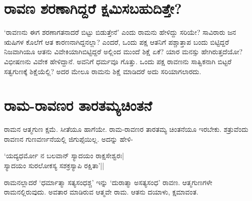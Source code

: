 \section*{ರಾವಣ ಶರಣಾಗಿದ್ದರೆ ಕ್ಷಮಿಸಬಹುದಿತ್ತೇ?}

`ರಾವಣನು ಈಗ ಶರಣಾಗತನಾದರೆ ಬಿಟ್ಟು ಬಿಡುತ್ತೇನೆ' ಎಂದು ರಾಮನು ಹೇಳಿದ್ದು  ಸರಿಯೇ? ಸಾವಿರಾರು ಜನ ಋಷಿಗಳ ಕೊಲೆಗೆ ಆತ ಕಾರಣನಾಗಿದ್ದನಲ್ಲಾ? ಎಂದರೆ, ಒಂದು ಪಕ್ಷ ಆತನಿಗೆ ಪಶ್ಚಾತ್ತಾಪ ಬಂದು ಬಿಟ್ಟಿದ್ದರೆ ನಿಜವಾಗಿಯೂ ಆತನು ವಿವೇಕಿಯಾಗಿಬಿಟ್ಟಿದ್ದರೆ ಅಲ್ಲಿಂದ ಮುಂದೆ ಶಿಕ್ಷೆ ಏಕೆ? ಯಾರ ಮನಸ್ಸು ಹೇಗಿರುತ್ತದೆಯೋ? ವಿಭೀಷಣನು ವಿವೇಕ ಹೇಳಿದ್ದಾನೆ. ಅವನಿಗೆ ಧರ್ಮವೂ ಗೊತ್ತು. ಒಂದು ಪಕ್ಷ ರಾವಣನು ಸಾತ್ವಿಕನಾಗಿ ಬಿಟ್ಟರೆ ಸತ್ವಗುಣಕ್ಕೆ ಶಿಕ್ಷೆಯೆಲ್ಲಿ? ಅದರ ಮೇಲೂ ರಾಮನು ಶಿಕ್ಷೆ ಮಾಡಿದರೆ ಅದು ಸರಿಯಾಗಲಾರದು.

\section*{ರಾಮ-ರಾವಣರ ತಾರತಮ್ಯಚಿಂತನೆ}

ರಾಮನ ಆತ್ಮಗುಣ ಕ್ಷಮೆ. ಸೀತೆಯೂ ಹಾಗೆಯೇ. ರಾಮ-ರಾವಣರ ತಾರತಮ್ಯ ಚಿಂತನೆಯೂ ಇರಬೇಕು. ಶತ್ರುವೆಂದು ರಾವಣನ ಗುಣವರ್ಣನೆಯಲ್ಲಿ ಜಿಗುಪ್ಸೆಯಿಲ್ಲ. ಅದನ್ನು ಹೇಳಿ-

\begin{shloka}
`ಯದ್ಯಧರ್ಮೋ ನ ಬಲವಾನ್ ಸ್ಯಾದಯಂ ರಾಕ್ಷಸೇಶ್ವರಃ|\\
ಸ್ಯಾದಯಂ ಸುರಲೋಕಸ್ಯ ಸಶಕ್ರಸ್ಯಾಪಿ ರಕ್ಷಿತಾ'||
\end{shloka}

ರಾಮನಲ್ಲಾದರೆ `ಧರ್ಮಾತ್ಮಾ ಸತ್ಯಸಂಧಶ್ಚ' ಇನ್ನು `ದುರಾತ್ಮಾ ಅಸತ್ಯಸಂಧ' ರಾವಣ. ಆತ್ಮಗುಣಗಳೇ ರಾಮನಲ್ಲಿರುವುದು. ಅವತಾರ ಮಾಡಿರುವ ಆತ್ಮವೇ ರಾಮ. ಆತನು ದಯಾಳು, ಕ್ಷಮಾವಂತ.
